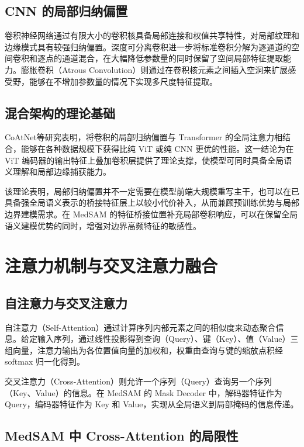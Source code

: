 \subsection{CNN 的局部归纳偏置}

卷积神经网络通过有限大小的卷积核具备局部连接和权值共享特性，对局部纹理和边缘模式具有较强归纳偏置\cite{he2016resnet}。深度可分离卷积\cite{howard2017mobilenets}进一步将标准卷积分解为逐通道的空间卷积和逐点的通道混合，在大幅降低参数量的同时保留了空间局部特征提取能力。膨胀卷积（Atrous Convolution）\cite{yu2016dilated}则通过在卷积核元素之间插入空洞来扩展感受野，能够在不增加参数量的情况下实现多尺度特征提取\cite{chen2018deeplabv3plus}。

\subsection{混合架构的理论基础}

CoAtNet\cite{dai2021coatnet}等研究表明，将卷积的局部归纳偏置与 Transformer 的全局注意力相结合，能够在各种数据规模下获得比纯 ViT 或纯 CNN 更优的性能。这一结论为在 ViT 编码器的输出特征上叠加卷积层提供了理论支撑，使模型可同时具备全局语义理解和局部边缘捕获能力。

该理论表明，局部归纳偏置并不一定需要在模型前端大规模重写主干，也可以在已具备强全局语义表示的桥接特征层上以较小代价补入，从而兼顾预训练优势与局部边界建模需求。在 MedSAM 的特征桥接位置补充局部卷积响应，可以在保留全局语义建模优势的同时，增强对边界高频特征的敏感性。

\section{注意力机制与交叉注意力融合}

\subsection{自注意力与交叉注意力}

自注意力（Self-Attention）\cite{vaswani2017attention}通过计算序列内部元素之间的相似度来动态聚合信息。给定输入序列，通过线性投影得到查询（Query）、键（Key）、值（Value）三组向量，注意力输出为各位置值向量的加权和，权重由查询与键的缩放点积经 softmax 归一化得到。

交叉注意力（Cross-Attention）则允许一个序列（Query）查询另一个序列（Key、Value）的信息。在 MedSAM 的 Mask Decoder 中，解码器特征作为 Query，编码器特征作为 Key 和 Value，实现从全局语义到局部掩码的信息传递。

\subsection{MedSAM 中 Cross-Attention 的局限性}

